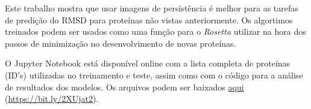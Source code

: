 Este trabalho mostra que usar imagens de persistência é melhor para as tarefas de predição do RMSD
para proteínas não vistas anteriormente. Os algortimos treinados podem ser usados como uma função
para o \textit{Rosetta} utilizar na hora dos passos de minimização no desenvolvimento de novas proteínas.

O Jupyter Notebook \cite{Kluyver2016} está disponível online com a lista completa de proteínas (ID's) utilizadas 
no treinamento e teste, assim como com o código para a análise de resultados dos modelos. Os arquivos
podem ser baixados \href{https://drive.google.com/file/d/160DZgRiPwsHNaTzasQxd2VaIXCUkiLZG/view?usp=sharing}{aqui}
(\url{https://bit.ly/2XUjat2}).

